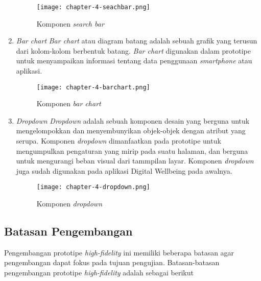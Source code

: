 \begin{enumerate}
  \begin{figure}[h]
    \centering
    \texttt{[image: chapter-4-seachbar.png]}
    \caption{Komponen \textit{search bar}}
    \label{img:searchbar}
  \end{figure}
  \FloatBarrier

  \item \textit{Bar chart}
  \subitem \textit{Bar chart} atau diagram batang adalah sebuah grafik yang terusun dari kolom-kolom berbentuk batang. \textit{Bar chart} digunakan dalam prototipe untuk menyampaikan informasi tentang data penggunaan \textit{smartphone} atau aplikasi.
 
  \begin{figure}[h]
    \centering
    \texttt{[image: chapter-4-barchart.png]}
    \caption{Komponen \textit{bar chart}}
    \label{img:searchbar}
  \end{figure}
  \FloatBarrier

  \item \textit{Dropdown}
  \subitem \textit{Dropdown} adalah sebuah komponen desain yang berguna untuk mengelompokkan dan menyembunyikan objek-objek dengan atribut yang serupa. Komponen \textit{dropdown} dimanfaatkan pada prototipe untuk mengumpulkan pengaturan yang mirip pada suatu halaman, dan berguna untuk mengurangi beban visual dari tammpilan layar. Komponen \textit{dropdown} juga sudah digunakan pada aplikasi Digital Wellbeing pada awalnya.
 
  \begin{figure}[h]
    \centering
    \texttt{[image: chapter-4-dropdown.png]}
    \caption{Komponen \textit{dropdown}}
    \label{img:dropdown}
  \end{figure}
  \FloatBarrier

\end{enumerate}


\subsection{Batasan Pengembangan}
\label{subsec:hifi_1_batasan}

Pengembangan prototipe \textit{high-fidelity} ini memiliki beberapa batasan agar pengembangan dapat fokus pada tujuan pengujian. Batasan-batasan pengembangan prototipe \textit{high-fidelity} adalah sebagai berikut


